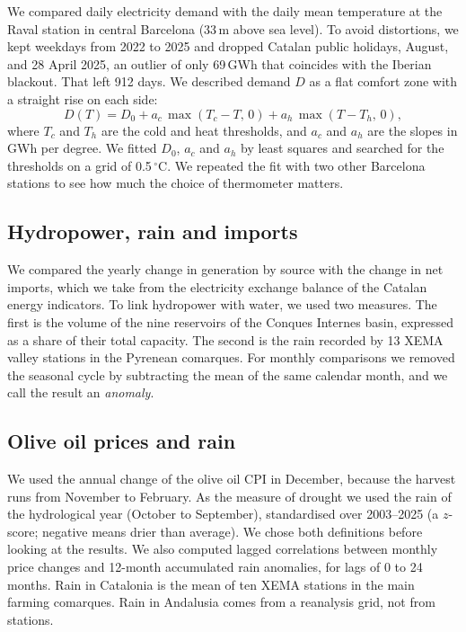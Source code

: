 \documentclass[11pt,a4paper]{article}
\begin{document}
We compared daily electricity demand with the daily mean temperature at the Raval station in central Barcelona (33\,m above sea level). To avoid distortions, we kept weekdays from 2022 to 2025 and dropped Catalan public holidays, August, and 28 April 2025, an outlier of only 69\,GWh that coincides with the Iberian blackout. That left 912 days. We described demand $D$ as a flat comfort zone with a straight rise on each side:
\begin{equation}
D(T)=D_0+a_c\,\max(T_c-T,\,0)+a_h\,\max(T-T_h,\,0),
\end{equation}
where $T_c$ and $T_h$ are the cold and heat thresholds, and $a_c$ and $a_h$ are the slopes in GWh per degree. We fitted $D_0$, $a_c$ and $a_h$ by least squares and searched for the thresholds on a grid of 0.5\,$^\circ$C. We repeated the fit with two other Barcelona stations to see how much the choice of thermometer matters.

\subsection{Hydropower, rain and imports}

We compared the yearly change in generation by source with the change in net imports, which we take from the electricity exchange balance of the Catalan energy indicators. To link hydropower with water, we used two measures. The first is the volume of the nine reservoirs of the Conques Internes basin, expressed as a share of their total capacity. The second is the rain recorded by 13 XEMA valley stations in the Pyrenean comarques. For monthly comparisons we removed the seasonal cycle by subtracting the mean of the same calendar month, and we call the result an \emph{anomaly}.

\subsection{Olive oil prices and rain}

We used the annual change of the olive oil CPI in December, because the harvest runs from November to February. As the measure of drought we used the rain of the hydrological year (October to September), standardised over 2003--2025 (a $z$-score; negative means drier than average). We chose both definitions before looking at the results. We also computed lagged correlations between monthly price changes and 12-month accumulated rain anomalies, for lags of 0 to 24 months. Rain in Catalonia is the mean of ten XEMA stations in the main farming comarques. Rain in Andalusia comes from a reanalysis grid, not from stations.
\end{document}
